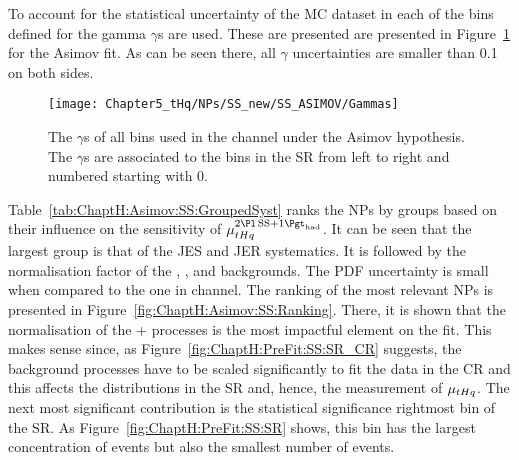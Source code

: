 To account for the statistical uncertainty of the MC dataset in each of the bins defined
for \dilepSStau  the gamma $\gamma$s are used. These are presented are presented 
in Figure~\ref{fig:ChaptH:Asimov:SS:Gammas} for the Asimov fit. As can be seen there,
all $\gamma$ uncertainties are smaller than 0.1 on both sides. 


\begin{figure}[h]
\centering
 \texttt{[image: Chapter5\_tHq/NPs/SS\_new/SS\_ASIMOV/Gammas]}
\caption{The $\gamma$s of all bins used in the \dilepSStau channel under the Asimov hypothesis.
The $\gamma$s are associated to the bins in the SR from left to right
and numbered starting with 0.} 
\label{fig:ChaptH:Asimov:SS:Gammas}
\end{figure}


Table~\ref{tab:ChaptH:Asimov:SS:GroupedSyst} ranks the NPs by groups based on
their influence on the sensitivity of $\mu_{\tHq}^{\dilepSStau}$. It can be seen that
the largest group is that of the JES and JER systematics. It is followed by the
normalisation factor of the \ttbar, \ttW, \ttH and \ttZ backgrounds.
The PDF uncertainty is small when compared to the one in \dilepOStau channel.
The ranking of the most relevant NPs is presented in Figure~\ref{fig:ChaptH:Asimov:SS:Ranking}.
There, it is shown that the normalisation of the \mbox{\ttbar+\ttX} processes is the most impactful element
on the \tHq fit. This makes sense since, as Figure~\ref{fig:ChaptH:PreFit:SS:SR_CR} suggests,
the background processes have to be scaled significantly to fit the data in the CR and this
affects the distributions in the SR and, hence, the measurement of $\mu_{tHq}$.
The next most significant contribution is the statistical significance rightmost bin of the SR. 
As Figure~\ref{fig:ChaptH:PreFit:SS:SR} shows, this bin has the largest concentration of \tHq events
but also the smallest number of events.  



